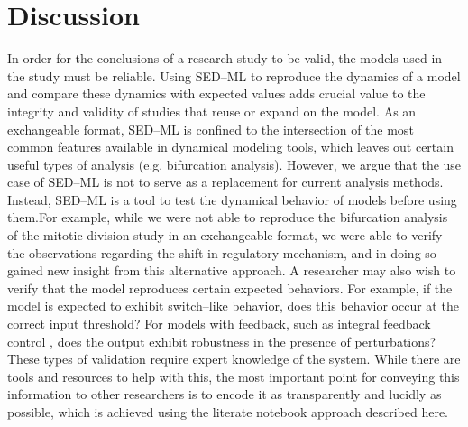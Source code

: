 \documentclass[10pt,letterpaper]{article}
\begin{document}
\section*{Discussion}

In order for the conclusions of a research study to be valid, the models used in the study must be reliable. Using SED--ML to reproduce the dynamics of a model and compare these dynamics with expected values adds crucial value to the integrity and validity of studies that reuse or expand on the model. As an exchangeable format, SED--ML is confined to the intersection of the most common features available in dynamical modeling tools, which leaves out certain useful types of analysis (e.g. bifurcation analysis). However, we argue that the use case of SED--ML is not to serve as a replacement for current analysis methods. Instead, SED--ML is a tool to test the dynamical behavior of models before using them.For example, while we were not able to reproduce the bifurcation analysis of the mitotic division study \cite{calzone2007dynamical} in an exchangeable format, we were able to verify the observations regarding the shift in regulatory mechanism, and in doing so gained new insight from this alternative approach.
A researcher may also wish to verify that the model reproduces certain expected behaviors. For example, if the model is expected to exhibit switch--like behavior, does this behavior occur at the correct input threshold? For models with feedback, such as integral feedback control \cite{briat2016antithetic}, does the output exhibit robustness in the presence of perturbations? These types of validation require expert knowledge of the system. While there are tools and resources to help with this, the most important point for conveying this information to other researchers is to encode it as transparently and lucidly as possible, which is achieved using the literate notebook approach described here.
\end{document}
